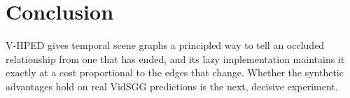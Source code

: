 \documentclass[10pt]{article}
\begin{document}
\section{Conclusion}
V-HPED gives temporal scene graphs a principled way to tell an occluded
relationship from one that has ended, and its lazy implementation maintains
it exactly at a cost proportional to the edges that change. Whether the
synthetic advantages hold on real VidSGG predictions is the next,
decisive experiment.



\end{document}
